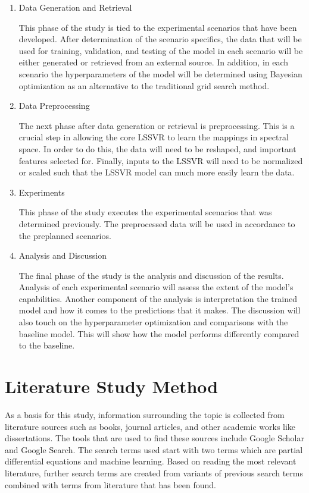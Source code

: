 \begin{enumerate}
      \item Data Generation and Retrieval

            This phase of the study is tied to the experimental scenarios that have been developed. After determination of the scenario specifics, the data that will be used for training, validation, and testing of the model in each scenario will be either generated or retrieved from an external source. In addition, in each scenario the hyperparameters of the model will be determined using Bayesian optimization as an alternative to the traditional grid search method.

      \item Data Preprocessing

            The next phase after data generation or retrieval is preprocessing. This is a crucial step in allowing the core LSSVR to learn the mappings in spectral space. In order to do this, the data will need to be reshaped, and important features selected for. Finally, inputs to the LSSVR will need to be normalized or scaled such that the LSSVR model can much more easily learn the data.

      \item Experiments

            This phase of the study executes the experimental scenarios that was determined previously. The preprocessed data will be used in accordance to the preplanned scenarios.

      \item Analysis and Discussion

            The final phase of the study is the analysis and discussion of the results. Analysis of each experimental scenario will assess the extent of the model's capabilities. Another component of the analysis is interpretation the trained model and how it comes to the predictions that it makes. The discussion will also touch on the hyperparameter optimization and comparisons with the baseline model. This will show how the model performs differently compared to the baseline.
\end{enumerate}

\section{Literature Study Method}
\noindent As a basis for this study, information surrounding the topic is collected from literature sources such as books, journal articles, and other academic works like dissertations. The tools that are used to find these sources include Google Scholar and Google Search. The search terms used start with two terms which are partial differential equations and machine learning. Based on reading the most relevant literature, further search terms are created from variants of previous search terms combined with terms from literature that has been found.

